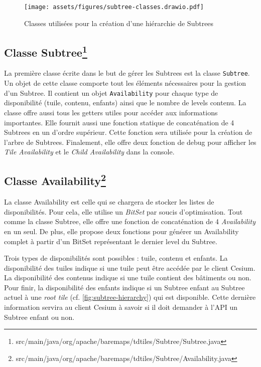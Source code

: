 \begin{figure}[H]
    \centering
    \texttt{[image: assets/figures/subtree-classes.drawio.pdf]}
    \caption{Classes utilisées pour la création d'une hiérarchie de Subtrees}
    \label{fig:subtree-classes}
\end{figure}

\subsection*{Classe Subtree\footnote{src/main/java/org/apache/baremaps/tdtiles/Subtree/Subtree.java}}
\label{sec:subtree-class}

La première classe écrite dans le but de gérer les Subtrees est la classe \texttt{Subtree}. Un objet de cette classe comporte tout les éléments nécessaires pour la gestion d'un Subtree. Il contient un objet \texttt{Availability} pour chaque type de disponibilité (tuile, contenu, enfants) ainsi que le nombre de levels contenu. La classe offre aussi tous les getters utiles pour accéder aux informations importantes. Elle fournit aussi une fonction statique de concaténation de 4 Subtrees en un d'ordre supérieur. Cette fonction sera utilisée pour la création de l'arbre de Subtrees. Finalement, elle offre deux fonction de debug pour afficher les \textit{Tile Availability} et le \textit{Child Availability} dans la console.

\subsection*{Classe Availability\footnote{src/main/java/org/apache/baremaps/tdtiles/Subtree/Availability.java}}
\label{sec:availability-class}

La classe Availability est celle qui se chargera de stocker les listes de disponibilités. Pour cela, elle utilise un \textit{BitSet} par soucis d'optimisation. Tout comme la classe Subtree, elle offre une fonction de concaténation de 4 \textit{Availability} en un seul. De plus, elle propose deux fonctions pour générer un Availability complet à partir d'un BitSet représentant le dernier level du Subtree.

Trois types de disponibilités sont possibles : tuile, contenu et enfants. La disponibilité des tuiles indique si une tuile peut être accédée par le client Cesium. La disponibilité des contenus indique si une tuile contient des bâtiments ou non. Pour finir, la disponibilité des enfants indique si un Subtree enfant au Subtree actuel à une \textit{root tile} (cf. \autoref{fig:subtree-hierarchy}) qui est disponible. Cette dernière information servira au client Cesium à savoir si il doit demander à l'API un Subtree enfant ou non.

